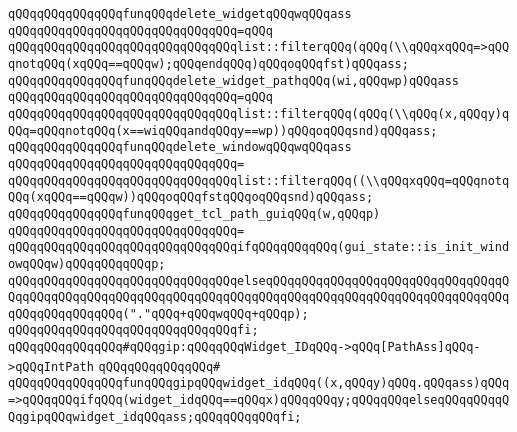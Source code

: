 \newline
\verb|qQQqqQQqqQQqqQQqfunqQQqdelete_widgetqQQqwqQQqass|\newline
\verb|qQQqqQQqqQQqqQQqqQQqqQQqqQQqqQQq=qQQq|\newline
\verb|qQQqqQQqqQQqqQQqqQQqqQQqqQQqqQQqlist::filterqQQq(qQQq(\\qQQqxqQQq=>qQQqnotqQQq(xqQQq==qQQqw);qQQqendqQQq)qQQqoqQQqfst)qQQqass;|\newline
\newline
\verb|qQQqqQQqqQQqqQQqfunqQQqdelete_widget_pathqQQq(wi,qQQqwp)qQQqass|\newline
\verb|qQQqqQQqqQQqqQQqqQQqqQQqqQQqqQQq=qQQq|\newline
\verb|qQQqqQQqqQQqqQQqqQQqqQQqqQQqqQQqlist::filterqQQq(qQQq(\\qQQq(x,qQQqy)qQQq=qQQqnotqQQq(x==wiqQQqandqQQqy==wp))qQQqoqQQqsnd)qQQqass;|\newline
\newline
\newline
\verb|qQQqqQQqqQQqqQQqfunqQQqdelete_windowqQQqwqQQqass|\newline
\verb|qQQqqQQqqQQqqQQqqQQqqQQqqQQqqQQq=|\newline
\verb|qQQqqQQqqQQqqQQqqQQqqQQqqQQqqQQqlist::filterqQQq((\\qQQqxqQQq=qQQqnotqQQq(xqQQq==qQQqw))qQQqoqQQqfstqQQqoqQQqsnd)qQQqass;|\newline
\newline
\newline
\verb|qQQqqQQqqQQqqQQqfunqQQqget_tcl_path_guiqQQq(w,qQQqp)|\newline
\verb|qQQqqQQqqQQqqQQqqQQqqQQqqQQqqQQq=|\newline
\verb|qQQqqQQqqQQqqQQqqQQqqQQqqQQqqQQqifqQQqqQQqqQQq(gui_state::is_init_windowqQQqw)qQQqqQQqqQQqp;|\newline
\verb|qQQqqQQqqQQqqQQqqQQqqQQqqQQqqQQqelseqQQqqQQqqQQqqQQqqQQqqQQqqQQqqQQqqQQqqQQqqQQqqQQqqQQqqQQqqQQqqQQqqQQqqQQqqQQqqQQqqQQqqQQqqQQqqQQqqQQqqQQqqQQqqQQqqQQqqQQq("."qQQq+qQQqwqQQq+qQQqp);|\newline
\verb|qQQqqQQqqQQqqQQqqQQqqQQqqQQqqQQqfi;|\newline
\newline
\verb|qQQqqQQqqQQqqQQq#qQQqgip:qQQqqQQqWidget_IDqQQq->qQQq[PathAss]qQQq->qQQqIntPath|\newline
\verb|qQQqqQQqqQQqqQQq#|\newline
\verb|qQQqqQQqqQQqqQQqfunqQQqgipqQQqwidget_idqQQq((x,qQQqy)qQQq.qQQqass)qQQq=>qQQqqQQqifqQQq(widget_idqQQq==qQQqx)qQQqqQQqy;qQQqqQQqelseqQQqqQQqqQQqgipqQQqwidget_idqQQqass;qQQqqQQqqQQqfi;|\newline
